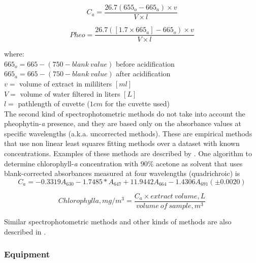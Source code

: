 \begin{appendices}
\begin{equation}
  C_a = \frac{26.7(655_o - 665_a)\times v}{V\times l}
\end{equation}

\begin{equation}
  Pheo = \frac{26.7([1.7\times 665_a]-665_o)\times v}{V\times l}
\end{equation}

\noindent where: \\
$665_o = 665 - (750-blank~value)$ before acidification\\
$665_a = 665 - (750-blank~value)$ after acidification  \\
$v = $ volume of extract in mililiters $[ml]$ \\
$V = $ volume of water filtered in liters $[L]$ \\
$l = $ pathlength of cuvette ($1cm$ for the cuvette used) \\

The second kind of spectrophotometric methods do not take into account the pheophytin-{\it a} presence, and they are based only on the absorbance values at specific wavelengths (a.k.a. uncorrected methods). These are empirical methods that use non linear least squares fitting methods over a dataset with known concentrations. Examples of these methods are described by \citet{Ritchie:2008eu}. One algorithm to determine chlorophyll-{\it a} concentration with $90\%$ acetone as solvent that uses blank-corrected absorbances measured at four wavelengths (quadrichroic) is \citep{Ritchie:2008eu}
\begin{equation}
  C_a = -0.3319A_{630}-1.7485*A_{647}+11.9442A_{664}-1.4306A_{691} (\pm 0.0020)
\end{equation}

\begin{equation}
  Chlorophyll a, mg/m^3 = \frac{C_a\times extract~volume, L}{volume~of~sample, m^3}
\end{equation}

Similar spectrophotometric methods and other kinds of methods are also described in \citet{StandardMethodsWater2011}.
\subsubsection[Equipment]{Equipment \citep{Tyler2013_chl_protocol}}
\begin{multicols}{2}

\end{multicols}
\end{appendices}
